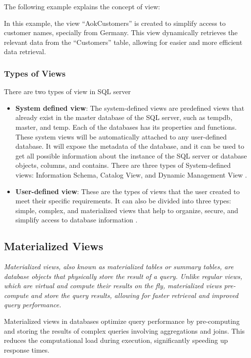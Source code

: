 The following example explains the concept of view:



 In this example, the view ``AokCustomers'' is created to simplify access to customer names, specially from Germany. This view dynamically retrieves the relevant data from the ``Customers'' table, allowing for easier and more efficient data retrieval.
 
\subsubsection{Types of Views}

There are two types of view in SQL server
\begin{itemize}
    \item \textbf{System defined view}: The system-defined views are predefined views that already exist in the master database of the SQL server, such as tempdb, master, and temp. Each of the databases has its properties and functions. These system views will be automatically attached to any user-defined database. It will expose the metadata of the database, and it can be used to get all possible information about the instance of the SQL server or database objects, columns, and contains. There are three types of System-defined views: Information Schema, Catalog View, and Dynamic Management View \cite{chauhan-2024}.
    \item \textbf{User-defined view}: These are the types of views that the user created to meet their specific requirements. It can also be divided into three types: simple, complex, and materialized views that help to organize, secure, and simplify access to database information \cite{javapoint-author-2024}.
\end{itemize}
   
\subsection{Materialized Views}\label{term:materialized_views}
\noindent\textit{Materialized views, also known as materialized tables or summary tables, are database objects that physically store the result of a query. Unlike regular views, which are virtual and compute their results on the fly, materialized views pre-compute and store the query results, allowing for faster retrieval and improved query performance.} \vspace{.3cm}

Materialized views in databases optimize query performance by pre-computing and storing the results of complex queries involving aggregations and joins. This reduces the computational load during execution, significantly speeding up response times.\vspace{.4cm}

